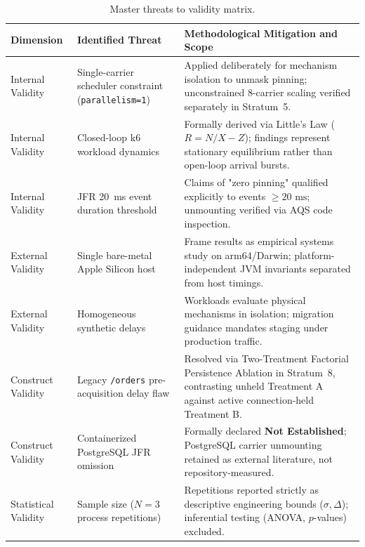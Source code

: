 \begin{table}[htbp]
  \centering
  \caption{Master threats to validity matrix.}
  \label{tab:master-validity}
  \begin{tabularx}{\textwidth}{@{}>{\raggedright\arraybackslash}p{}>{\raggedright\arraybackslash}p{}>{\raggedright\arraybackslash}X@{}}
    \toprule
    \textbf{Dimension} & \textbf{Identified Threat} & \textbf{Methodological Mitigation and Scope} \\
    \midrule
    Internal Validity & Single-carrier scheduler constraint (\texttt{parallelism=1}) & Applied deliberately for mechanism isolation to unmask pinning; unconstrained 8-carrier scaling verified separately in Stratum~5. \\
    \addlinespace
    Internal Validity & Closed-loop k6 workload dynamics & Formally derived via Little's Law ($R = N/X - Z$); findings represent stationary equilibrium rather than open-loop arrival bursts. \\
    \addlinespace
    Internal Validity & JFR 20~ms event duration threshold & Claims of "zero pinning" qualified explicitly to events $\ge 20\text{ ms}$; unmounting verified via AQS code inspection. \\
    \addlinespace
    External Validity & Single bare-metal Apple Silicon host & Frame results as empirical systems study on arm64/Darwin; platform-independent JVM invariants separated from host timings. \\
    \addlinespace
    External Validity & Homogeneous synthetic delays & Workloads evaluate physical mechanisms in isolation; migration guidance mandates staging under production traffic. \\
    \addlinespace
    Construct Validity & Legacy \texttt{/orders} pre-acquisition delay flaw & Resolved via Two-Treatment Factorial Persistence Ablation in Stratum~8, contrasting unheld Treatment A against active connection-held Treatment B. \\
    \addlinespace
    Construct Validity & Containerized PostgreSQL JFR omission & Formally declared \textbf{Not Established}; PostgreSQL carrier unmounting retained as external literature, not repository-measured. \\
    \addlinespace
    Statistical Validity & Sample size ($N=3$ process repetitions) & Repetitions reported strictly as descriptive engineering bounds ($\sigma, \Delta$); inferential testing (ANOVA, $p$-values) excluded. \\
    \bottomrule
  \end{tabularx}
\end{table}

